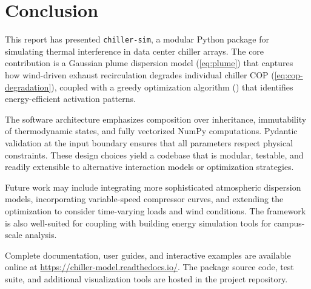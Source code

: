 \documentclass[11pt, a4paper]{article}
\begin{document}
\section{Conclusion}
\label{sec:conclusion}

This report has presented \texttt{chiller-sim}, a modular Python package for simulating thermal interference in data center chiller arrays.
The core contribution is a Gaussian plume dispersion model (\cref{eq:plume}) that captures how wind-driven exhaust recirculation degrades individual chiller COP (\cref{eq:cop-degradation}), coupled with a greedy optimization algorithm () that identifies energy-efficient activation patterns.

The software architecture emphasizes composition over inheritance, immutability of thermodynamic states, and fully vectorized NumPy computations.
Pydantic validation at the input boundary ensures that all parameters respect physical constraints.
These design choices yield a codebase that is modular, testable, and readily extensible to alternative interaction models or optimization strategies.

Future work may include integrating more sophisticated atmospheric dispersion models, incorporating variable-speed compressor curves, and extending the optimization to consider time-varying loads and wind conditions.
The framework is also well-suited for coupling with building energy simulation tools for campus-scale analysis.

Complete documentation, user guides, and interactive examples are available online at \url{https://chiller-model.readthedocs.io/}.
The package source code, test suite, and additional visualization tools are hosted in the project repository.

\printbibliography
\end{document}
